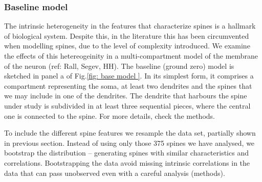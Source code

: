 \documentclass[10pt,letterpaper]{article}
\begin{document}
\newpage
\subsubsection*{Baseline model}

The intrinsic heterogeneity in the features that characterize spines is a hallmark of biological system. Despite this, in the literature this has been circumvented when modelling spines, due to the level of complexity introduced. We examine the effects of this hetereogeinity in a multi-compartment model of the membrane of the neuron (ref: Rall, Segev, HH). The baseline (ground zero) model is sketched in panel a of Fig.\ref{fig: base model }. In its simplest form, it comprises a compartment representing the soma, at least two dendrites and the spines that we may include in one of the dendrites. The dendrite that harbours the spine under study is subdivided in at least three sequential pieces, where the central one is connected to the spine. For more details, check the methods.

To include the different spine features we resample the data set, partially shown in previous section. Instead of using only those 375 spines we have analysed, we bootstrap the distribution -- generating spines with similar characteristics and correlations. Bootstrapping the data avoid missing intrinsic correlations in the data that can pass unobserved even with a careful analysis (methods). 
\end{document}
